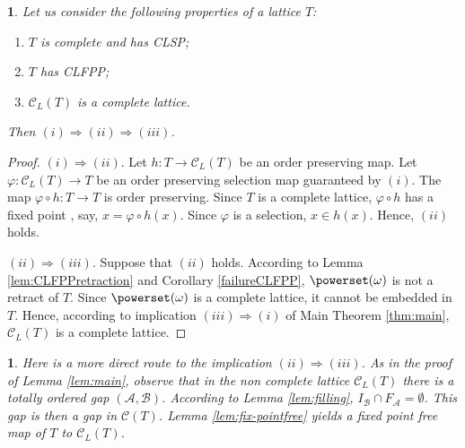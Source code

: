 \documentclass[12pt]{amsart}
\newtheorem{proposition}[definition]{\noindent {\bf Proposition}}
\newtheorem{remark}[definition]{\noindent {\bf Remark}}\newtheorem{problem}[definition]{\noindent {\bf Problem}}
\begin{document}
\begin{proposition}\label{routineproposition}
Let us consider the following properties of a lattice 
$T$: 

\begin{enumerate}[{(i)}]
 \item $T$ is complete and has  CLSP;\\[-.3cm]
 \item $T$ has  CLFPP;\\[-.3cm]
 \item $\mathcal{C}_{ L}(T)$ is a complete lattice. \\[-.3cm]
\end{enumerate}

\noindent
Then $(i)\Rightarrow(ii)\Rightarrow (iii)$. 
\end{proposition}

\begin{proof}
$(i)\Rightarrow (ii)$. Let $h: T \rightarrow \mathcal{C}_{ L}(T)$ be
an order preserving map.  Let $\varphi:\mathcal{C}_{ L}(T)\rightarrow
T$ be an order preserving selection map guaranteed by $(i)$.  The map
$\varphi\circ h: T \rightarrow T$ is order preserving. Since $T$ is a
complete lattice, $\varphi \circ h$ has a fixed point \cite{tarski},
say, $x=\varphi \circ h(x)$.  Since $\varphi$ is a selection, $x\in
h(x)$. Hence, $(ii)$ holds.

\medskip

\noindent $(ii)\Rightarrow (iii)$.  Suppose that $(ii)$ holds. According to Lemma   \ref{lem:CLFPPretraction} and 
Corollary \ref{failureCLFPP}, $\powerset (\omega)$ is not a retract of
$T$. Since $\powerset (\omega)$ is a complete lattice, it cannot be
embedded in $T$. Hence, according to implication $(iii)\Rightarrow
(i)$ of Main Theorem \ref{thm:main}, $\mathcal{C}_{ L}(T)$ is a complete
lattice. \end{proof}

\begin{remark} \label{rem: shorter} Here is a more direct route to the implication $(ii)\Rightarrow (iii)$.
As in the proof of Lemma \ref{lem:main}, observe that in the non complete lattice $\mathcal{C}_{ L}(T)$ 
there is a totally ordered gap $(\mathcal A,\mathcal B)$.  According to Lemma \ref{lem:filling},  
$I_{\mathcal B}\cap F_{\mathcal A} = \emptyset$. This gap is then a gap in $\mathcal C(T)$.  
Lemma \ref{lem:fix-pointfree} yields a fixed point free map of $T$ to $\mathcal{C}_{ L}(T)$.\\
\end{remark}
\end{document}
